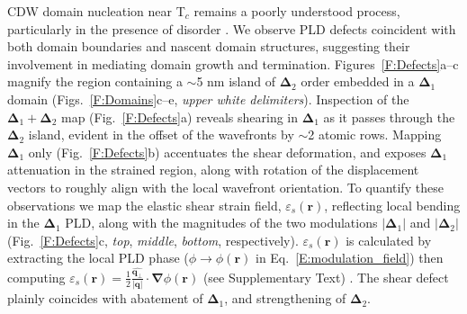 \documentclass[12pt]{article}
\begin{document}
CDW domain nucleation near T$_c$ remains a poorly understood process, particularly in the presence of disorder \cite{LeTacon2013,Liu1998}.
We observe PLD defects coincident with both domain boundaries and nascent domain structures, suggesting their involvement in mediating domain growth and termination.
Figures~\ref{F:Defects}a--c magnify the region containing a $\sim$5 nm island of $\mathbf{\Delta}_2$ order embedded in a $\mathbf{\Delta}_1$ domain (Figs.~\ref{F:Domains}c--e, \textit{upper white delimiters}).
Inspection of the $\mathbf{\Delta}_1+\mathbf{\Delta}_2$ map  (Fig.~\ref{F:Defects}a) reveals shearing in $\mathbf{\Delta}_1$ as it passes through the $\mathbf{\Delta}_2$ island, evident in the offset of the wavefronts by $\sim$2 atomic rows. 
Mapping $\mathbf{\Delta}_1$ only (Fig.~\ref{F:Defects}b) accentuates the shear deformation, and exposes $\mathbf{\Delta}_1$ attenuation in the strained region, along with rotation of the displacement vectors to roughly align with the local wavefront orientation.
To quantify these observations we map the elastic shear strain field, $\varepsilon_s(\mathbf{r})$, reflecting local bending in the $\mathbf{\Delta}_1$ PLD, along with the magnitudes of the two modulations $\lvert\mathbf{\Delta}_1\rvert$ and $\lvert\mathbf{\Delta}_2\rvert$ (Fig.~\ref{F:Defects}c, \textit{top}, \textit{middle}, \textit{bottom}, respectively).
$\varepsilon_s(\mathbf{r})$ is calculated by extracting the local PLD phase ($\phi\to\phi(\mathbf{r})$ in Eq.~\ref{E:modulation_field}) \cite{Lawler2010} then computing $\varepsilon_s(\mathbf{r}) = \frac{1}{2}\frac{\widehat{\mathbf{q}_\perp}}{\lvert\mathbf{q}\rvert} \cdot\mathbf{\nabla}\phi(\mathbf{r})$ (see Supplementary Text) \cite{Feinberg1988,Brazovskii2004}.
The shear defect plainly coincides with abatement of $\mathbf{\Delta}_1$, and strengthening of $\mathbf{\Delta}_2$.
\end{document}
